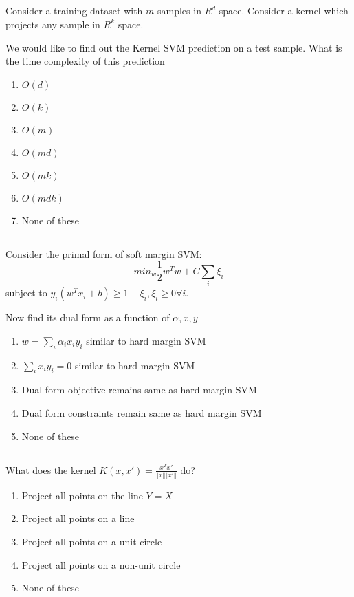 \begin{frame}
\section{}
Consider a training dataset with $m$ samples in $R^d$ space. Consider a kernel which projects any sample in $R^{k}$ space.

We would like to find out the Kernel SVM prediction on a test sample. What is the time complexity of this prediction
\begin{enumerate}[label=(\Alph*)]
\item $O(d)$
\item $O(k)$
\item $O(m)$
\item $O(md)$   %
\item $O(mk)$
\item $O(mdk)$
\item None of these  %
\end{enumerate}
\end{frame}

\begin{frame}
\section{}
Consider the primal form of soft margin SVM:
\[ min_w \frac12w^Tw + C\sum_i \xi_i \] subject to
$y_i(w^Tx_i+b)\geq1-\xi_i, \xi_i\geq0 \forall i$.

Now find its dual form as a function of $\alpha,x,y$

\begin{enumerate}[label=(\Alph*)]
\item $w=\sum_i \alpha_ix_iy_i$ similar to hard margin SVM    %
\item $\sum_i x_iy_i = 0$ similar to hard margin SVM    %
\item Dual form objective remains same as hard margin SVM   %
\item Dual form constraints remain same as hard margin SVM
\item None of these     %
\end{enumerate}
\end{frame}

\begin{frame}
\section{}
What does the kernel $K(x,x') = \frac{x^Tx'}{\Vert x\Vert \Vert x'\Vert}$ do?
\begin{enumerate}[label=(\Alph*)]
\item Project all points on the line $Y=X$
\item Project all points on a line
\item Project all points on a unit circle   %
\item Project all points on a non-unit circle
\item None of these  %
\end{enumerate}
\end{frame}


